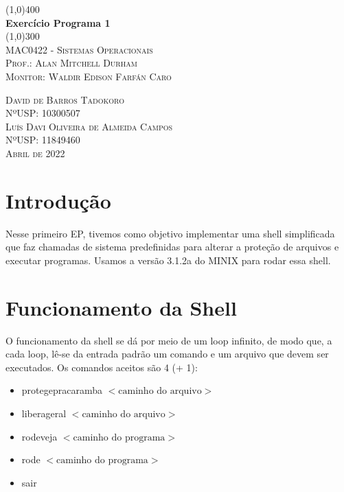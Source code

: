\documentclass[a4paper, 12pt]{article}
\begin{document}
\begin{titlepage}
	\begin{center}
		\line(1,0){400} \\
		[0.25in]
		\huge{\bfseries Exercício Programa 1} \\
		[0.01in]
		\line(1,0){300} \\
		[0.5cm]
		\textsc{\Large MAC0422 - Sistemas Operacionais} \\
		[1.5cm]
		\textsc{\large Prof.: Alan Mitchell Durham}\\
		\textsc{\large Monitor: Waldir Edison Farfán Caro}\\
		[12cm]
	\end{center}
	\begin{flushright}
		\textsc{David de Barros Tadokoro}\\
		\textsc{NºUSP: 10300507}\\
		\textsc{Luís Davi Oliveira de Almeida Campos}\\
		\textsc{NºUSP: 11849460}\\
		\textsc{Abril de 2022}
	\end{flushright}
\end{titlepage}

\newpage

\section{Introdução}

Nesse primeiro EP, tivemos como objetivo implementar uma shell simplificada que faz chamadas de sistema predefinidas para alterar a proteção de arquivos e executar programas. Usamos a versão 3.1.2a do MINIX para rodar essa shell.

\section{Funcionamento da Shell}

O funcionamento da shell se dá por meio de um loop infinito, de modo que, a cada loop, lê-se da entrada padrão um comando e um arquivo que devem ser executados. Os comandos aceitos são 4 (+ 1):

\begin{itemize}
	\item protegepracaramba $<\textrm{caminho do arquivo}>$
	\item liberageral $<\textrm{caminho do arquivo}>$
	\item rodeveja $<\textrm{caminho do programa}>$
	\item rode $<\textrm{caminho do programa}>$
	\item sair
\end{itemize}
\end{document}
